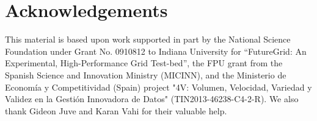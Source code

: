\documentclass[final,5p,times,twocolumn]{elsarticle}
\begin{document}








\section*{Acknowledgements}

This material is based upon work supported in part by the National Science Foundation under Grant No. 0910812 to Indiana University for ``FutureGrid: An Experimental, High-Performance Grid Test-bed'', the FPU grant from the Spanish Science and Innovation Ministry (MICINN), and the Ministerio de Econom\'ia y Competitividad (Spain) project "4V: Volumen, Velocidad, Variedad y Validez en la Gesti\'on Innovadora de Datos" (TIN2013-46238-C4-2-R). We also thank Gideon Juve and Karan Vahi for their valuable help.




\end{document}

